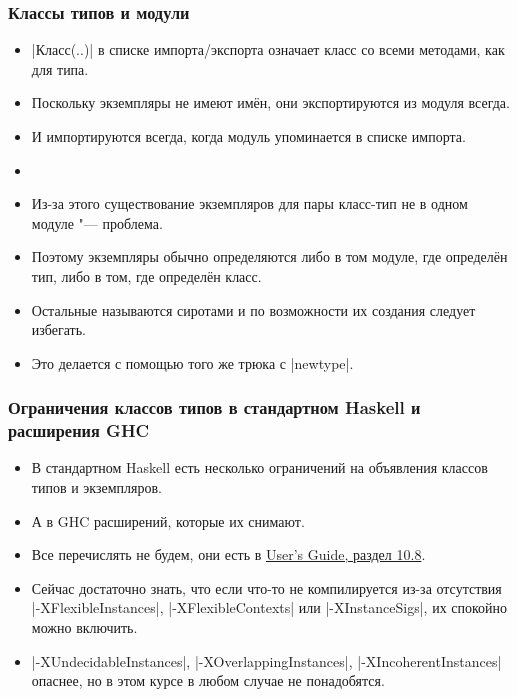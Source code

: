 \documentclass[10pt]{beamer}
\begin{document}
\begin{frame}[fragile]
  \frametitle{Классы типов и модули}
  \begin{itemize}
    \item \haskinline|Класс(..)| в списке импорта/экспорта означает класс со всеми методами, как для типа.
    \item Поскольку экземпляры не имеют имён, они экспортируются из модуля всегда.
    \item И импортируются всегда, когда модуль упоминается в списке импорта.\pause
    \item[]
    \item Из-за этого существование экземпляров для пары класс-тип не в одном модуле "--- проблема.
    \item Поэтому экземпляры обычно определяются либо в том модуле, где определён тип, либо в том, где определён класс.
    \item Остальные называются сиротами и по возможности их создания следует избегать.
    \item Это делается с помощью того же трюка с \haskinline|newtype|.
  \end{itemize}
\end{frame}

\begin{frame}[fragile]
  \frametitle{Ограничения классов типов в стандартном Haskell и расширения GHC}
  \begin{itemize}
    \item В стандартном Haskell есть несколько ограничений на объявления классов типов и экземпляров.
    \item А в GHC расширений, которые их снимают.
    \item Все перечислять не будем, они есть в  \href{http://downloads.haskell.org/~ghc/latest/docs/html/users_guide/glasgow_exts.html#class-declarations}{User's Guide, раздел 10.8}.
    \item Сейчас достаточно знать, что если что-то не компилируется из-за отсутствия \haskinline|-XFlexibleInstances|, \haskinline|-XFlexibleContexts| или \haskinline|-XInstanceSigs|, их спокойно можно включить.
    \item \haskinline|-XUndecidableInstances|, \haskinline|-XOverlappingInstances|, \haskinline|-XIncoherentInstances| опаснее, но в этом курсе в любом случае не понадобятся.
  \end{itemize}
\end{frame}

%
\end{document}
